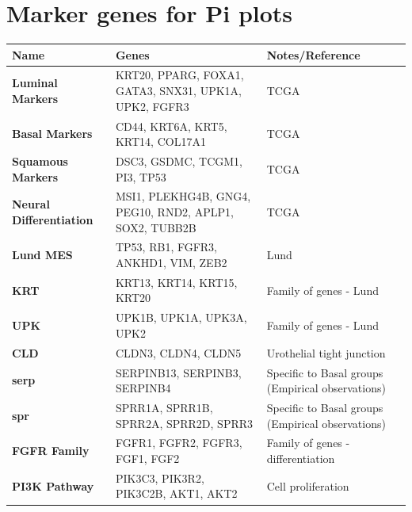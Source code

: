 \section{Marker genes for Pi plots} \label{s:ap:pi_genes} 


\begin{table}[H]
    \centering
    \scriptsize
    \begin{tabularx}{\textwidth}{>{\hsize=0.6\hsize}X|>{\hsize=1.4\hsize}X|>{\hsize=1\hsize}X}
        \toprule
        \textbf{Name} & \textbf{Genes} & \textbf{Notes/Reference} \\
        \midrule
        \textbf{Luminal Markers} & KRT20, PPARG, FOXA1, GATA3, SNX31, UPK1A, UPK2, FGFR3 & TCGA \cite{Robertson2017-mg} \\
        \midrule
        \textbf{Basal Markers} & CD44, KRT6A, KRT5, KRT14, COL17A1 & TCGA \cite{Robertson2017-mg} \\
        \midrule
        \textbf{Squamous Markers} & DSC3, GSDMC, TCGM1, PI3, TP53 & TCGA \cite{Robertson2017-mg} \\
        \midrule
        \textbf{Neural Differentiation} & MSI1, PLEKHG4B, GNG4, PEG10, RND2, APLP1, SOX2, TUBB2B & TCGA \cite{Robertson2017-mg} \\
        \midrule
        \textbf{Lund MES} & TP53, RB1, FGFR3, ANKHD1, VIM, ZEB2 & Lund \cite{Marzouka2018-ge} \\
        \midrule
        \textbf{KRT} & KRT13, KRT14, KRT15, KRT20 & Family of genes - Lund \cite{Marzouka2018-ge}\\
        \midrule
        \textbf{UPK} & UPK1B, UPK1A, UPK3A, UPK2 & Family of genes - Lund \cite{Marzouka2018-ge}\\
        \midrule
        \textbf{CLD} & CLDN3, CLDN4, CLDN5 & Urothelial tight junction \cite{Smith2015-rj}  \\
        \midrule
        \textbf{serp} & SERPINB13, SERPINB3, SERPINB4 & Specific to Basal groups (Empirical observations) \\
        \midrule
        \textbf{spr} & SPRR1A, SPRR1B, SPRR2A, SPRR2D, SPRR3 & Specific to Basal groups (Empirical observations) \\
        \midrule
        \textbf{FGFR Family} & FGFR1, FGFR2, FGFR3, FGF1, FGF2 & Family of genes - differentiation \\
        \midrule
        \textbf{PI3K Pathway} & PIK3C3, PIK3R2, PIK3C2B, AKT1, AKT2 & Cell proliferation \citet{Sathe2018-cq} \\

\end{tabularx}
\end{table}
